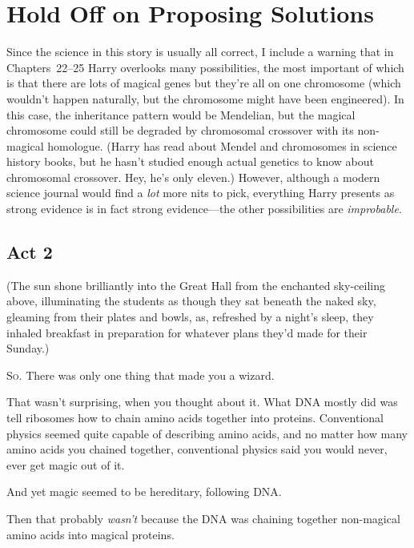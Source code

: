 \chapter{Hold Off on Proposing Solutions}

\begin{chapterOpeningAuthorNote}
Since the science in this story is usually all correct, I include a warning that in Chapters~22–25 Harry overlooks many possibilities, the most important of which is that there are lots of magical genes but they're all on one chromosome (which wouldn’t happen naturally, but the chromosome might have been engineered). In this case, the inheritance pattern would be Mendelian, but the magical chromosome could still be degraded by chromosomal crossover with its non-magical homologue. (Harry has read about Mendel and chromosomes in science history books, but he hasn’t studied enough actual genetics to know about chromosomal crossover. Hey, he’s only eleven.) However, although a modern science journal would find a \emph{lot} more nits to pick, everything Harry presents as strong evidence is in fact strong evidence—the other possibilities are \emph{improbable}.
\end{chapterOpeningAuthorNote}

\section{Act 2}

(The sun shone brilliantly into the Great Hall from the enchanted sky-ceiling above, illuminating the students as though they sat beneath the naked sky, gleaming from their plates and bowls, as, refreshed by a night’s sleep, they inhaled breakfast in preparation for whatever plans they’d made for their Sunday.)

\lettrine{S}{o.} There was only one thing that made you a wizard.

That wasn’t surprising, when you thought about it. What DNA mostly did was tell ribosomes how to chain amino acids together into proteins. Conventional physics seemed quite capable of describing amino acids, and no matter how many amino acids you chained together, conventional physics said you would never, ever get magic out of it.

And yet magic seemed to be hereditary, following DNA.

Then that probably \emph{wasn’t} because the DNA was chaining together non-magical amino acids into magical proteins.

